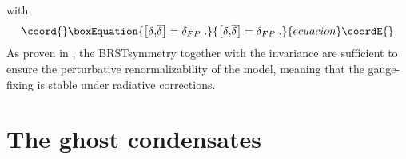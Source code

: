 \documentclass[a4paper,12pt]{article}
\begin{document}
with 
\begin{equation}\coord{}\boxEquation{
\left[ \delta \mathrm{{,}\overline{\delta }}\right] =\delta _{FP}\;.
\label{al}
}{
\left[ \delta \mathrm{{,}\overline{\delta }}\right] =\delta _{FP}\;.
}{ecuacion}\coordE{}\end{equation}
As proven in \cite{ds}, the BRST\myHighlight{$\;$}\coordHE{}symmetry together with the \myHighlight{$\delta $}\coordHE{}
invariance are sufficient to ensure the perturbative renormalizability of
the model, meaning that the gauge-fixing \myHighlight{$\left( \ref{cfg}\right) $}\coordHE{} is
stable under radiative corrections.

\section{The ghost condensates}
\end{document}
